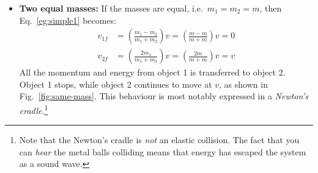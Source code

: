 \documentclass{../../oss-handout}
\begin{document}
\begin{itemize}[leftmargin=15pt]
\item\textbf{Two equal masses:} If the masses are equal, i.e.\ $m_1=m_2=m$,
  then Eq.~\ref{eg:simple1} becomes:
  \begin{align*}
    v_{1f}&=\left(\frac{m_1-m_2}{m_1+m_2}\right)v
    =\left(\frac{m-m}{m+m}\right)v=0\\
    v_{2f}&=\left(\frac{2m_1}{m_1+m_2}\right)v
    =\left(\frac{2m}{m+m}\right)v=v
  \end{align*}
  All the momentum and energy from object 1 is transferred to object 2. Object
  1 stops, while object 2 continues to move at $v$, as shown in
  Fig.~\ref{fig:same-mass}. This behaviour is most notably expressed in a
  \emph{Newton's cradle}.\footnote{Note that the Newton's cradle is \emph{not}
    an elastic collision. The fact that you can \emph{hear} the metal balls
    colliding means that energy has escaped the system as a sound wave.}
  \begin{figure}[ht]
    \centering
\end{figure}
\end{itemize}
\end{document}
